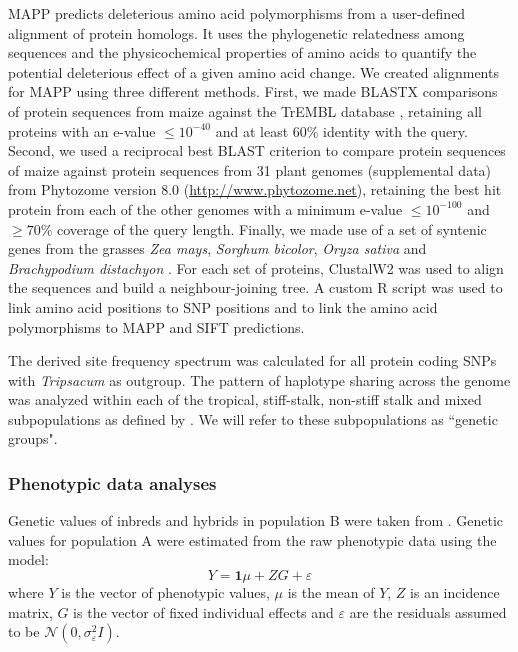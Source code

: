 \documentclass[12pt]{article}
\begin{document}
MAPP predicts deleterious amino acid polymorphisms from a user-defined alignment of protein homologs. It uses the phylogenetic relatedness among sequences and the physicochemical properties of amino acids to quantify the potential deleterious effect of a given amino acid change.  We created alignments for MAPP using three different methods.  First, we made BLASTX comparisons of protein sequences from maize against the TrEMBL database \citep{Boeckmann2003}, retaining all proteins with an e-value $\leq 10^{-40}$ and at least 60\% identity with the query.  Second, we used a reciprocal best BLAST criterion to compare protein sequences of maize against protein sequences from 31 plant genomes (supplemental data)  from Phytozome version 8.0 (\url{http://www.phytozome.net}), retaining the best hit protein from each of the other genomes with a minimum e-value $\leq 10^{-100}$ and  $\geq 70\%$ coverage of the query length. Finally, we made use of a set of syntenic genes from the grasses \emph{Zea mays}, \emph{Sorghum bicolor}, \emph{Oryza sativa} and \emph{Brachypodium distachyon}  \citep{Schnable2012}. For each set of proteins, ClustalW2 \citep{Larkin2007} was used to align the sequences and build a neighbour-joining tree. A custom R script was used to link amino acid positions to SNP positions and to link the amino acid polymorphisms to MAPP and SIFT predictions.

The derived site frequency spectrum was calculated for all protein coding SNPs with \emph{Tripsacum} as outgroup. 
The pattern of haplotype sharing across the genome \citep[PHS statistics;][]{Toomajian2006} was analyzed within each of the tropical, stiff-stalk, non-stiff stalk and mixed subpopulations as defined by \citet{Flint-Garcia2005}. We will refer to these subpopulations as ``genetic groups".

\subsubsection*{Phenotypic data analyses}

Genetic values %
of inbreds and hybrids in population B were taken from \citet{Flint-Garcia2009}. 
Genetic values for population A were estimated from the raw phenotypic data using the model:
%
\[Y=\mathbf{1}\mu +ZG+\varepsilon \]
%
where $Y$ is the vector of phenotypic values, $\mu$ is the mean of $Y$, $Z$ is an incidence matrix, $G$ is the vector of fixed individual effects and $\varepsilon$ are the residuals assumed to be $\mathcal{N}(0,\sigma _{\varepsilon }^{2}I)$.
\end{document}
